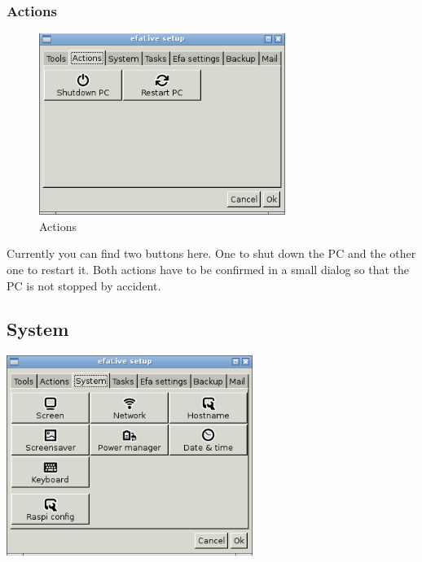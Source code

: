 \documentclass[a4paper,12pt,twoside]{article}
\begin{document}
\subsubsection{Actions}
\label{sct:actions}

\begin{figure}
    \centering
    \includegraphics[width=8cm]{screenshots/efalive_setup_actions.png}
    \caption{Actions}
    \label{fig:efalivesetup_actions}
\end{figure}

Currently you can find two buttons here. One to shut down the PC and the
other one to restart it. Both actions have to be confirmed in a small
dialog so that the PC is not stopped by accident.


\subsection{System}
\label{sct:efalive_system}

\bigskip
\begin{minipage}{\linewidth}
    \centering
    \captionsetup{type=figure}
    \includegraphics[width=8cm]{screenshots/efalive_setup_system.png}
    \label{fig:efalivesetup_system}
\end{minipage}
\bigskip
\end{document}
